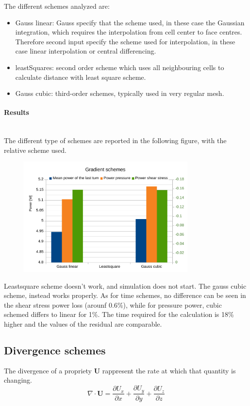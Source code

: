 \documentclass[a4paper,12pt]{article}
\begin{document}
The different schemes analyzed are:
\begin{itemize} 
 \item {\ttfamily Gauss linear}: Gauss specify that the scheme used, in these case the Gaussian integration, which requires the interpolation from cell center to face centres. Therefore second input specify the scheme used for interpolation, in these case linear interpolation or central differencing.
 
 \item {\ttfamily leastSquares}: second order scheme which uses all neighbouring cells to calculate distance with least square scheme.
 
 \item {\ttfamily Gauss cubic}: third-order schemes, typically used in very regular mesh.
 \end{itemize} 
 
 
\paragraph{Results} \mbox{}\\
The different type of schemes are reported in the following figure, with the relative scheme used. 
\begin{figure}[H]
\centering
\includegraphics[height=6cm]{images/schemes/gradschems-results.pdf}
\end{figure}
Leastsquare scheme doesn't work, and simulation does not start. The gauss cubic scheme, instead works properly.
As for time schemes, no difference can be seen in the shear stress power loss (arounf 0.6\%), while for pressure power, cubic schemed differs to linear for 1\%. The time required for the calculation is 18\% higher and the values of the residual are comparable.

\subsection{Divergence schemes}
The divergence of a propriety $\bm{U}$ rappresent the rate at which that quantity is changing.
\begin{equation}
 \nabla \cdot \bm{U} = \frac{\partial U_x}{\partial x}+ \frac{\partial U_y}{\partial y} + \frac{\partial U_z}{\partial z} 
\end{equation}
\end{document}

